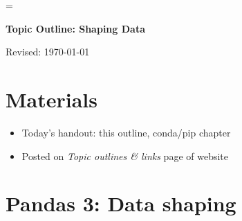 \documentclass[11pt]{article}
\begin{document}
\parskip=\bigskipamount
\parindent=0.0in
\thispagestyle{empty}


\bigskip\bigskip
\centerline{\Large \bf Topic Outline:  Shaping Data}
\centerline{Revised: \today}

\section*{Materials}

\begin{itemize}
\item  Today's handout:  this outline, conda/pip chapter 
\item  Posted on {\it Topic outlines \& links\/} page of website
\end{itemize}


\begin{comment}
\section*{Review}

Give an example of
\begin{itemize}
\item
\end{itemize}
\end{comment}


\section*{Pandas 3:  Data shaping}
\end{document}
